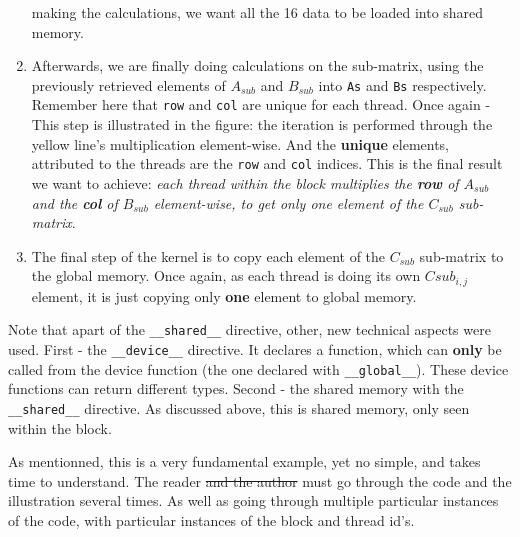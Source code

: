 \documentclass[12pt]{article}
\begin{document}
\begin{enumerate}
   making the calculations, we want all the 16 data to be loaded into shared memory.
   \item Afterwards, we are finally doing calculations on the sub-matrix, using the previously retrieved elements of $A_{sub}$ and $B_{sub}$ into \verb|As| and \verb|Bs| respectively.
   Remember here that \verb|row| and \verb|col| are unique for each thread. Once again - This step is illustrated in the figure: the iteration is performed through the yellow 
   line's multiplication element-wise. And the \textbf{unique} elements, attributed to the threads are the \verb|row| and \verb|col| indices. This is the final result 
   we want to achieve: \textit{each thread within the block multiplies the \textbf{row} of $A_{sub}$ and the \textbf{col} of $B_{sub}$ element-wise, to get only one element of the $C_{sub}$ sub-matrix}.
   \item The final step of the kernel is to copy each element of the $C_{sub}$ sub-matrix to the global memory. Once again, 
   as each thread is doing its own $Csub_{i,j}$ element, it is just copying only \textbf{one} element to global memory.   
\end{enumerate}
   Note that apart of the \verb|__shared__| directive, other, new technical aspects were used. First - the \verb|__device__| directive.
   It declares a function, which can \textbf{only} be called from the device function (the one declared with \verb|__global__|). These device functions 
   can return different types. Second - the shared memory with the \verb|__shared__| directive. As discussed above, this is shared memory, only seen within the block.
    

   As mentionned, this is a very fundamental example, yet no simple, and takes time to understand. The reader \sout{and the author} must go through the code 
   and the illustration several times. As well as going through multiple particular instances of the code, with particular instances of the block and thread id's.
\end{document}

